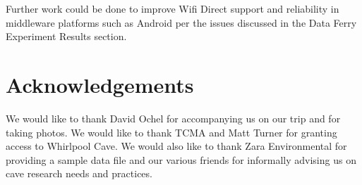 \documentclass[10pt,twocolumn]{article}
\begin{document}
Further work could be done to improve Wifi Direct support and reliability in middleware platforms such as Android per the issues discussed in the Data Ferry Experiment Results section.

\section{Acknowledgements}
We would like to thank David Ochel for accompanying us on our trip and for taking photos. 
We would like to thank TCMA and Matt Turner for granting access to Whirlpool Cave. 
We would also like to thank Zara Environmental for providing a sample data file
and our various friends for informally advising us on cave research needs and practices.

% 



\end{document}
